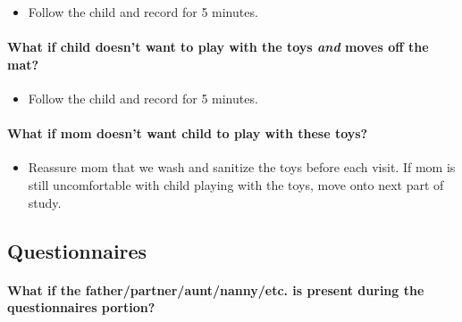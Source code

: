 \documentclass[
  12pt,
]{book}
\providecommand{\tightlist}{%
  \setlength{\itemsep}{0pt}\setlength{\parskip}{0pt}}
\begin{document}
\begin{itemize}
\tightlist
\item
  Follow the child and record for 5 minutes.
\end{itemize}

\hypertarget{what-if-child-doesnt-want-to-play-with-the-toys-and-moves-off-the-mat}{%
\paragraph*{\texorpdfstring{What if child doesn't want to play with the toys \emph{and} moves off the mat?}{What if child doesn't want to play with the toys and moves off the mat?}}\label{what-if-child-doesnt-want-to-play-with-the-toys-and-moves-off-the-mat}}

\begin{itemize}
\tightlist
\item
  Follow the child and record for 5 minutes.
\end{itemize}

\hypertarget{what-if-mom-doesnt-want-child-to-play-with-these-toys}{%
\paragraph*{What if mom doesn't want child to play with these toys?}\label{what-if-mom-doesnt-want-child-to-play-with-these-toys}}

\begin{itemize}
\tightlist
\item
  Reassure mom that we wash and sanitize the toys before each visit. If mom is still uncomfortable with child playing with the toys, move onto next part of study.
\end{itemize}

\hypertarget{faqs_questionnaires}{%
\subsection{Questionnaires}\label{faqs_questionnaires}}

\hypertarget{what-if-the-fatherpartnerauntnannyetc.-is-present-during-the-questionnaires-portion}{%
\paragraph*{What if the father/partner/aunt/nanny/etc. is present during the questionnaires portion?}\label{what-if-the-fatherpartnerauntnannyetc.-is-present-during-the-questionnaires-portion}}
\end{document}
